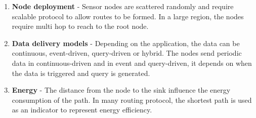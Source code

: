 \begin{enumerate}
\item \textbf{Node deployment} - Sensor nodes are scattered randomly and require scalable protocol to allow routes to be formed. In a large region, the nodes require multi hop to reach to the root node.

\item \textbf{Data delivery models} - Depending on the application, the data can be continuous, event-driven, query-driven or hybrid. The nodes send periodic data in continuous-driven and in event and query-driven, it depends on when the data is triggered and query is generated.

\item \textbf{Energy} - The distance from the node to the sink influence the energy consumption of the path. In many routing protocol, the shortest path is used as an indicator to represent energy efficiency.
\end{enumerate}